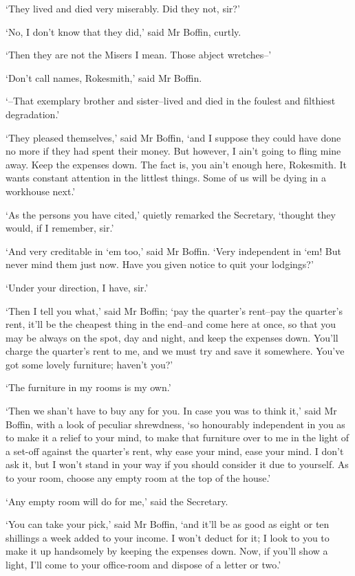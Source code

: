 ‘They lived and died very miserably. Did they not, sir?’

‘No, I don’t know that they did,’ said Mr Boffin, curtly.

‘Then they are not the Misers I mean. Those abject wretches--’

‘Don’t call names, Rokesmith,’ said Mr Boffin.

‘--That exemplary brother and sister--lived and died in the foulest and
filthiest degradation.’

‘They pleased themselves,’ said Mr Boffin, ‘and I suppose they could
have done no more if they had spent their money. But however, I ain’t
going to fling mine away. Keep the expenses down. The fact is, you ain’t
enough here, Rokesmith. It wants constant attention in the littlest
things. Some of us will be dying in a workhouse next.’

‘As the persons you have cited,’ quietly remarked the Secretary,
‘thought they would, if I remember, sir.’

‘And very creditable in ‘em too,’ said Mr Boffin. ‘Very independent in
‘em! But never mind them just now. Have you given notice to quit your
lodgings?’

‘Under your direction, I have, sir.’

‘Then I tell you what,’ said Mr Boffin; ‘pay the quarter’s rent--pay the
quarter’s rent, it’ll be the cheapest thing in the end--and come here at
once, so that you may be always on the spot, day and night, and keep the
expenses down. You’ll charge the quarter’s rent to me, and we must try
and save it somewhere. You’ve got some lovely furniture; haven’t you?’

‘The furniture in my rooms is my own.’

‘Then we shan’t have to buy any for you. In case you was to think it,’
said Mr Boffin, with a look of peculiar shrewdness, ‘so honourably
independent in you as to make it a relief to your mind, to make that
furniture over to me in the light of a set-off against the quarter’s
rent, why ease your mind, ease your mind. I don’t ask it, but I won’t
stand in your way if you should consider it due to yourself. As to your
room, choose any empty room at the top of the house.’

‘Any empty room will do for me,’ said the Secretary.

‘You can take your pick,’ said Mr Boffin, ‘and it’ll be as good as eight
or ten shillings a week added to your income. I won’t deduct for it; I
look to you to make it up handsomely by keeping the expenses down. Now,
if you’ll show a light, I’ll come to your office-room and dispose of a
letter or two.’

